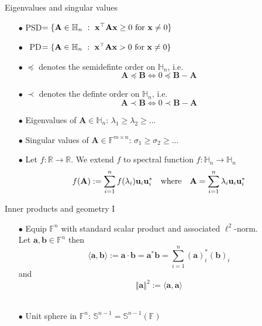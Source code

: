 \documentclass{beamer}
\newcommand{\bvec}[1]{\mathbf{#1}}
\newcommand{\va}{\bvec{a}}
\newcommand{\vb}{\bvec{b}}
\newcommand{\vu}{\bvec{u}}
\newcommand{\vx}{\bvec{x}}
\newcommand{\vA}{\bvec{A}}
\newcommand{\vB}{\bvec{B}}
\begin{document}
\begin{frame}{Eigenvalues and singular values}

\begin{itemize}
    \item[$\bullet$] PSD$=\{\vA \in \mathbb{H}_n ~:~ \vx^\top \vA \vx \geq 0 ~{\rm for}~ \vx \neq 0\}$
     \item[$\bullet$] \;~PD$=\{\vA \in \mathbb{H}_n ~:~ \vx^\top \vA \vx > 0 ~{\rm for}~ \vx \neq 0 \}$
     \item[$\bullet$] $\preccurlyeq$ denotes the semidefinte order on $\mathbb{H}_n$, i.e. 
     $$
     \vA \preccurlyeq \vB \Leftrightarrow 0 \preccurlyeq \vB- \vA
     $$
     \item[$\bullet$] $\prec$ denotes the definte order on $\mathbb{H}_n$, i.e. 
     $$
     \vA \prec \vB \Leftrightarrow 0  \prec \vB- \vA
     $$
     \item[$\bullet$] Eigenvalues of $\vA\in \mathbb{H}_n$: $\lambda_1 \geq \lambda_2\geq ...$
     \item[$\bullet$] Singular values of $\vA\in\mathbb{F}^{m\times n}$: $\sigma_1 \geq \sigma_2\geq ...$
     \item[$\bullet$] Let $f:\mathbb{R} \to \mathbb{R}$. We extend $f$ to spectral function $f:\mathbb{H}_n \to \mathbb{H}_n$
     $$
     f(\vA)
     :=
     \sum_{i=1}^n f(\lambda_i) \vu_i \vu_i^*
    \quad {\rm where} \quad
    \vA = \sum_{i=1}^n \lambda_i \vu_i \vu_i^*
     $$
\end{itemize}
\end{frame}

\begin{frame}{Inner products and geometry I}

\begin{itemize}
    \item[$\bullet$] Equip $\mathbb{F}^n$ with standard scalar product and associated $\ell^2$-norm.\\
    Let $\va, \vb \in \mathbb{F}^n$ then
    $$\langle \va, \vb  \rangle := \va \cdot \vb = \va^* \vb = \sum_{i=1}^n (\va)_i^* (\vb)_i$$
    and
    $$\Vert \va \Vert^2 := \langle \va, \va  \rangle$$\
    \item[$\bullet$] Unit sphere in $\mathbb{F}^n$: $\mathbb{S}^{n-1} = \mathbb{S}^{n-1}(\mathbb{F})$
\end{itemize}
    
\end{frame}
\end{document}
